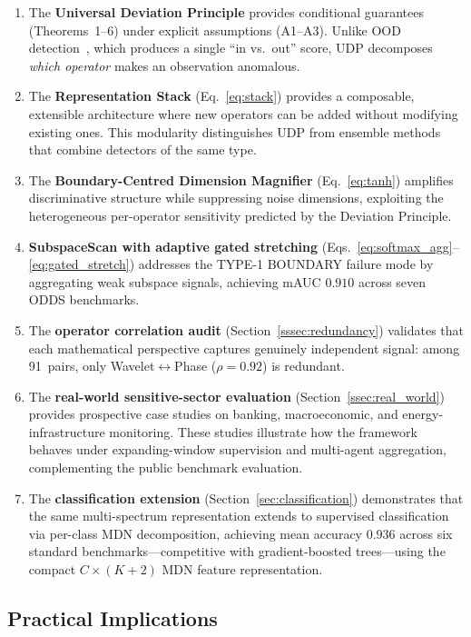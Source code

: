 \documentclass[journal]{IEEEtran}
\begin{document}
\begin{enumerate}
  \item The \textbf{Universal Deviation Principle} provides conditional guarantees (Theorems~1--6) under explicit assumptions (A1--A3). Unlike OOD detection~\cite{hendrycks2017baseline,liang2018odin,liu2020energy}, which produces a single ``in vs.\ out'' score, UDP decomposes \textit{which operator} makes an observation anomalous.
  \item The \textbf{Representation Stack} (Eq.~\eqref{eq:stack}) provides a composable, extensible architecture where new operators can be added without modifying existing ones. This modularity distinguishes UDP from ensemble methods~\cite{lazarevic2005feature} that combine detectors of the same type.
  \item The \textbf{Boundary-Centred Dimension Magnifier} (Eq.~\eqref{eq:tanh}) amplifies discriminative structure while suppressing noise dimensions, exploiting the heterogeneous per-operator sensitivity predicted by the Deviation Principle.
  \item \textbf{SubspaceScan with adaptive gated stretching} (Eqs.~\eqref{eq:softmax_agg}--\eqref{eq:gated_stretch}) addresses the TYPE-1 BOUNDARY failure mode by aggregating weak subspace signals, achieving mAUC $0.910$ across seven ODDS benchmarks.
  \item The \textbf{operator correlation audit} (Section~\ref{sssec:redundancy}) validates that each mathematical perspective captures genuinely independent signal: among 91~pairs, only Wavelet$\leftrightarrow$Phase ($\rho{=}0.92$) is redundant.
  \item The \textbf{real-world sensitive-sector evaluation} (Section~\ref{ssec:real_world}) provides prospective case studies on banking, macroeconomic, and energy-infrastructure monitoring.  These studies illustrate how the framework behaves under expanding-window supervision and multi-agent aggregation, complementing the public benchmark evaluation.
  \item The \textbf{classification extension} (Section~\ref{sec:classification}) demonstrates that the same multi-spectrum representation extends to supervised classification via per-class MDN decomposition, achieving mean accuracy $0.936$ across six standard benchmarks---competitive with gradient-boosted trees---using the compact $C{\times}(K{+}2)$ MDN feature representation.
\end{enumerate}

\subsection{Practical Implications}
\end{document}
